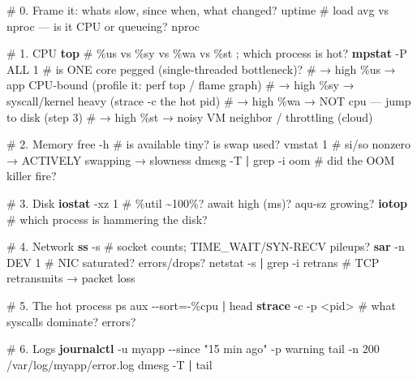 \documentclass[11pt]{article}
\newenvironment{Shaded}{\begin{snugshade}}{\end{snugshade}}
\newcommand{\AttributeTok}[1]{\textcolor[rgb]{0.16,0.50,0.73}{#1}}
\newcommand{\CommentTok}[1]{\textcolor[rgb]{0.48,0.49,0.49}{#1}}
\newcommand{\ExtensionTok}[1]{\textcolor[rgb]{0.00,0.60,1.00}{\textbf{#1}}}
\newcommand{\FunctionTok}[1]{\textcolor[rgb]{0.56,0.27,0.68}{#1}}
\newcommand{\KeywordTok}[1]{\textcolor[rgb]{0.81,0.81,0.76}{\textbf{#1}}}
\newcommand{\NormalTok}[1]{\textcolor[rgb]{0.81,0.81,0.76}{#1}}
\newcommand{\OperatorTok}[1]{\textcolor[rgb]{0.81,0.81,0.76}{#1}}
\newcommand{\StringTok}[1]{\textcolor[rgb]{0.96,0.31,0.31}{#1}}
\begin{document}
\begin{Shaded}
\begin{Highlighting}[]
\CommentTok{\# 0. Frame it: what\textquotesingle{}s slow, since when, what changed?}
\FunctionTok{uptime}                         \CommentTok{\# load avg vs nproc — is it CPU or queueing?}
\FunctionTok{nproc}

\CommentTok{\# 1. CPU}
\ExtensionTok{top}                            \CommentTok{\# \%us vs \%sy vs \%wa vs \%st ; which process is hot?}
\ExtensionTok{mpstat} \AttributeTok{{-}P}\NormalTok{ ALL 1                }\CommentTok{\# is ONE core pegged (single{-}threaded bottleneck)?}
\CommentTok{\#   → high \%us  → app CPU{-}bound (profile it: perf top / flame graph)}
\CommentTok{\#   → high \%sy  → syscall/kernel heavy (strace {-}c the hot pid)}
\CommentTok{\#   → high \%wa  → NOT cpu — jump to disk (step 3)}
\CommentTok{\#   → high \%st  → noisy VM neighbor / throttling (cloud)}

\CommentTok{\# 2. Memory}
\FunctionTok{free} \AttributeTok{{-}h}                        \CommentTok{\# is \textquotesingle{}available\textquotesingle{} tiny? is swap used?}
\FunctionTok{vmstat}\NormalTok{ 1                       }\CommentTok{\# si/so nonzero → ACTIVELY swapping → slowness}
\FunctionTok{dmesg} \AttributeTok{{-}T} \KeywordTok{|} \FunctionTok{grep} \AttributeTok{{-}i}\NormalTok{ oom         }\CommentTok{\# did the OOM killer fire?}

\CommentTok{\# 3. Disk}
\ExtensionTok{iostat} \AttributeTok{{-}xz}\NormalTok{ 1                   }\CommentTok{\# \%util \textasciitilde{}100\%? await high (ms)? aqu{-}sz growing?}
\ExtensionTok{iotop}                          \CommentTok{\# which process is hammering the disk?}

\CommentTok{\# 4. Network}
\ExtensionTok{ss} \AttributeTok{{-}s}                          \CommentTok{\# socket counts; TIME\_WAIT/SYN{-}RECV pileups?}
\ExtensionTok{sar} \AttributeTok{{-}n}\NormalTok{ DEV 1                   }\CommentTok{\# NIC saturated? errors/drops?}
\FunctionTok{netstat} \AttributeTok{{-}s} \KeywordTok{|} \FunctionTok{grep} \AttributeTok{{-}i}\NormalTok{ retrans   }\CommentTok{\# TCP retransmits → packet loss}

\CommentTok{\# 5. The hot process}
\FunctionTok{ps}\NormalTok{ aux }\AttributeTok{{-}{-}sort}\OperatorTok{=}\NormalTok{{-}\%cpu }\KeywordTok{|} \FunctionTok{head}
\ExtensionTok{strace} \AttributeTok{{-}c} \AttributeTok{{-}p} \OperatorTok{\textless{}}\NormalTok{pid}\OperatorTok{\textgreater{}}             \CommentTok{\# what syscalls dominate? errors?}

\CommentTok{\# 6. Logs}
\ExtensionTok{journalctl} \AttributeTok{{-}u}\NormalTok{ myapp }\AttributeTok{{-}{-}since} \StringTok{"15 min ago"} \AttributeTok{{-}p}\NormalTok{ warning}
\FunctionTok{tail} \AttributeTok{{-}n}\NormalTok{ 200 /var/log/myapp/error.log}
\FunctionTok{dmesg} \AttributeTok{{-}T} \KeywordTok{|} \FunctionTok{tail}
\end{Highlighting}
\end{Shaded}
\end{document}
